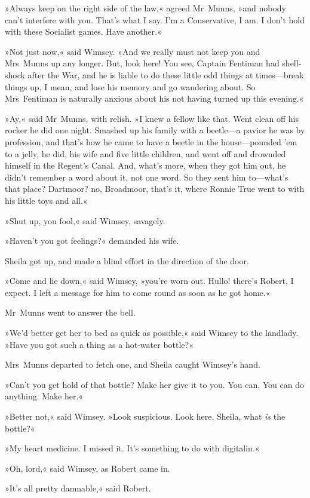 »Always keep on the right side of the law,« agreed Mr~Munns, »and nobody can't interfere with you. That's what I say. I'm a Conservative, I am. I don't hold with these Socialist games. Have another.«

»Not just now,« said Wimsey. »And we really must not keep you and Mrs~Munns up any longer. But, look here! You see, Captain Fentiman had shell-shock after the War, and he is liable to do these little odd things at times—break things up, I mean, and lose his memory and go wandering about. So Mrs~Fentiman is naturally anxious about his not having turned up this evening.«

»Ay,« said Mr~Munns, with relish. »I knew a fellow like that. Went clean off his rocker he did one night. Smashed up his family with a beetle—a pavior he was by profession, and that's how he came to have a beetle in the house—pounded 'em to a jelly, he did, his wife and five little children, and went off and drownded himself in the Regent's Canal. And, what's more, when they got him out, he didn't remember a word about it, not one word. So they sent him to—what's that place? Dartmoor? no, Broadmoor, that's it, where Ronnie True went to with his little toys and all.«

»Shut up, you fool,« said Wimsey, savagely.

»Haven't you got feelings?« demanded his wife.

Sheila got up, and made a blind effort in the direction of the door.

»Come and lie down,« said Wimsey, »you're worn out. Hullo! there's Robert, I expect. I left a message for him to come round as soon as he got home.«

Mr~Munns went to answer the bell.

»We'd better get her to bed as quick as possible,« said Wimsey to the landlady. »Have you got such a thing as a hot-water bottle?«

Mrs~Munns departed to fetch one, and Sheila caught Wimsey's hand.

»Can't you get hold of that bottle? Make her give it to you. You can. You can do anything. Make her.«

»Better not,« said Wimsey. »Look suspicious. Look here, Sheila, what \textit{is} the bottle?«

»My heart medicine. I missed it. It's something to do with digitalin.«

»Oh, lord,« said Wimsey, as Robert came in.

»It's all pretty damnable,« said Robert.


